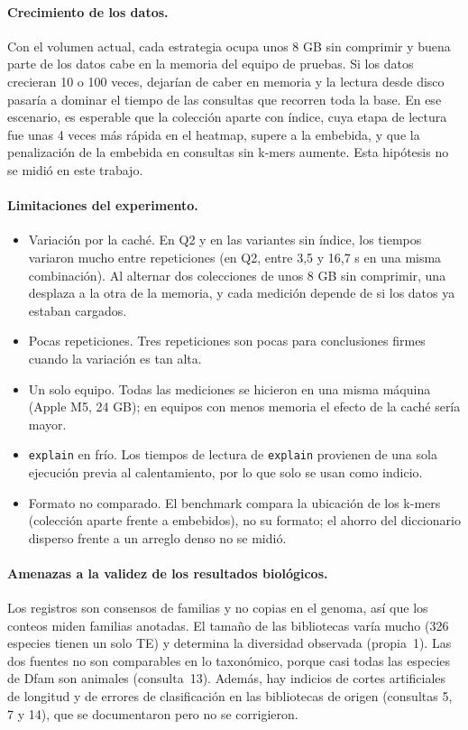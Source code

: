 \documentclass[unnumsec,namedate,webpdf,contemporary,large]{oup-authoring-template}
\begin{document}
\paragraph{Crecimiento de los datos.}
Con el volumen actual, cada estrategia ocupa unos 8 GB sin comprimir y buena parte de los datos cabe en la memoria del equipo de pruebas. Si los datos crecieran 10 o 100 veces, dejar\'ian de caber en memoria y la lectura desde disco pasar\'ia a dominar el tiempo de las consultas que recorren toda la base. En ese escenario, es esperable que la colecci\'on aparte con \'indice, cuya etapa de lectura fue unas 4 veces m\'as r\'apida en el heatmap, supere a la embebida, y que la penalizaci\'on de la embebida en consultas sin k-mers aumente. Esta hip\'otesis no se midi\'o en este trabajo.

\paragraph{Limitaciones del experimento.}
\begin{itemize}
\item Variaci\'on por la cach\'e. En Q2 y en las variantes sin \'indice, los tiempos variaron mucho entre repeticiones (en Q2, entre 3,5 y 16,7 s en una misma combinaci\'on). Al alternar dos colecciones de unos 8 GB sin comprimir, una desplaza a la otra de la memoria, y cada medici\'on depende de si los datos ya estaban cargados.
\item Pocas repeticiones. Tres repeticiones son pocas para conclusiones firmes cuando la variaci\'on es tan alta.
\item Un solo equipo. Todas las mediciones se hicieron en una misma m\'aquina (Apple M5, 24 GB); en equipos con menos memoria el efecto de la cach\'e ser\'ia mayor.
\item \texttt{explain} en fr\'io. Los tiempos de lectura de \texttt{explain} provienen de una sola ejecuci\'on previa al calentamiento, por lo que solo se usan como indicio.
\item Formato no comparado. El benchmark compara la ubicaci\'on de los k-mers (colecci\'on aparte frente a embebidos), no su formato; el ahorro del diccionario disperso frente a un arreglo denso no se midi\'o.
\end{itemize}

\paragraph{Amenazas a la validez de los resultados biol\'ogicos.}
Los registros son consensos de familias y no copias en el genoma, as\'i que los conteos miden familias anotadas. El tama\~no de las bibliotecas var\'ia mucho (326 especies tienen un solo TE) y determina la diversidad observada (propia~1). Las dos fuentes no son comparables en lo taxon\'omico, porque casi todas las especies de Dfam son animales (consulta~13). Adem\'as, hay indicios de cortes artificiales de longitud y de errores de clasificaci\'on en las bibliotecas de origen (consultas 5, 7 y 14), que se documentaron pero no se corrigieron.
\end{document}
